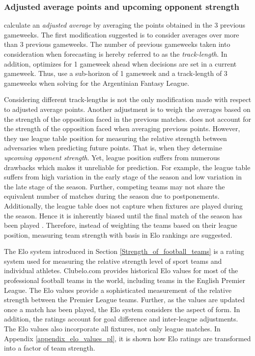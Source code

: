 \subsubsection{Adjusted average points and upcoming opponent strength}

\cite{Bonomo} calculate an \textit{adjusted average} by averaging the points obtained in the 3 previous gameweeks. The first modification suggested is to consider averages over more than 3 previous gameweeks. The number of previous gameweeks taken into consideration when forecasting is hereby referred to as the \textit{track-length}. In addition, \cite{Bonomo} optimizes for 1 gameweek ahead when decisions are set in a current gameweek. Thus, \cite{Bonomo} use a sub-horizon of 1 gameweek and a track-length of 3 gameweeks when solving for the Argentinian Fantasy League.

\newpar

Considering different track-lengths is not the only modification made with respect to adjusted average points. Another adjustment is to weigh the averages based on the strength of the opposition faced in the previous matches. \cite{Bonomo} does not account for the strength of the opposition faced when averaging previous points. However, they use league table position for measuring the relative strength between adversaries when predicting future points. That is, when they determine \textit{upcoming opponent strength}. Yet, league position suffers from numerous drawbacks which makes it unreliable for prediction. For example, the league table suffers from high variation in the early stage of the season and low variation in the late stage of the season. Further, competing teams may not share the equivalent number of matches during the season due to postponements. Additionally, the league table does not capture when fixtures are played during the season. Hence it is inherently biased until the final match of the season has been played \citep{Constantinou}. Therefore, instead of weighting the teams based on their league position, measuring team strength with basis in Elo rankings are suggested. 


\newpar

The Elo system introduced in Section \ref{Strength_of_football_teams} is a rating system used for measuring the relative strength level of sport teams and individual athletes. Clubelo.com provides historical Elo values for most of the professional football teams in the world, including teams in the English Premier League. The Elo values provide a sophisticated measurement of the relative strength between the Premier League teams. Further, as the values are updated once a match has been played, the Elo system considers the aspect of form. In addition, the ratings account for goal difference and inter-league adjustments. The Elo values also incorporate all fixtures, not only league matches. In Appendix \ref{appendix_elo_values_pl}, it is shown how Elo ratings are transformed into a factor of team strength. 

